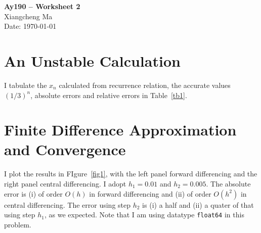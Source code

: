 \documentclass[11pt,letterpaper]{article}
\begin{document}
\begin{center}
\Large
{\bf Ay190 -- Worksheet 2} \\
\large
Xiangcheng Ma \\
Date: \today
\end{center}

\section{An Unstable Calculation}
I tabulate the $x_n$ calculated from recurrence relation, the accurate values $(1/3)^n$, absolute errors and relative errors in Table~\ref{tb1}.




\section{Finite Difference Approximation and Convergence}
I plot the results in FIgure~\ref{fig1}, with the left panel forward differencing and the right panel central differencing. I adopt $h_1=0.01$ and $h_2=0.005$. The absolute error is (i) of order $O(h)$ in forward differencing and (ii) of order $O(h^2)$ in central differencing. The error using step $h_2$ is (i) a half and (ii) a quater of that using step $h_1$, as we expected. Note that I am using datatype {\tt float64} in this problem.
\end{document}
